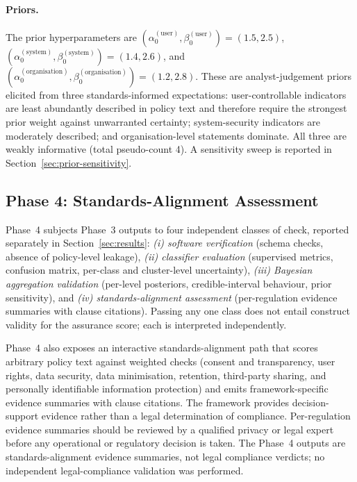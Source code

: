 \documentclass[final,3p,times,twocolumn]{elsarticle}
\begin{document}
	\paragraph{Priors.}
	The prior hyperparameters are
	$(\alpha_{0}^{(\text{user})}, \beta_{0}^{(\text{user})}) = (1.5, 2.5)$, $(\alpha
	_{0}^{(\text{system})}, \beta_{0}^{(\text{system})}) = (1.4, 2.6)$, and
	$(\alpha_{0}^{(\text{organisation})}, \beta_{0}^{(\text{organisation})}) = (1.2
	, 2.8)$. These are analyst-judgement priors elicited from three standards-informed
	expectations: user-controllable indicators are least abundantly described in
	policy text and therefore require the strongest prior weight against
	unwarranted certainty; system-security indicators are moderately described;
	and organisation-level statements dominate. All three are weakly informative (total
	pseudo-count 4). A sensitivity sweep is reported in Section~\ref{sec:prior-sensitivity}.

	\subsection{Phase 4: Standards-Alignment Assessment}
	\label{sec:phase4} Phase~4 subjects Phase~3 outputs to four independent
	classes of check, reported separately in Section~\ref{sec:results}: \emph{(i)
	software verification} (schema checks, absence of policy-level leakage), \emph{(ii)
	classifier evaluation} (supervised metrics, confusion matrix, per-class and cluster-level
	uncertainty), \emph{(iii) Bayesian aggregation validation} (per-level posteriors,
	credible-interval behaviour, prior sensitivity), and \emph{(iv) standards-alignment
	assessment} (per-regulation evidence summaries with clause citations). Passing
	any one class does not entail construct validity for the assurance score; each
	is interpreted independently. 

	Phase~4 also exposes an interactive standards-alignment path that scores
	arbitrary policy text against weighted checks (consent and transparency, user
	rights, data security, data minimisation, retention, third-party sharing, and personally
	identifiable information protection) and emits framework-specific evidence
	summaries with clause citations. The framework provides decision-support evidence
	rather than a legal determination of compliance. Per-regulation evidence
	summaries should be reviewed by a qualified privacy or legal expert before any
	operational or regulatory decision is taken. 
	The Phase~4 outputs are standards-alignment evidence summaries, not legal
	compliance verdicts; no independent legal-compliance validation was performed.
\end{document}
